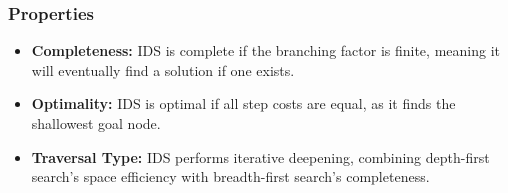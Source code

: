 \subsubsection*{Properties}
\begin{itemize}
    \item \textbf{Completeness:} IDS is complete if the branching factor is finite, meaning it will eventually find a solution if one exists.
    \item \textbf{Optimality:} IDS is optimal if all step costs are equal, as it finds the shallowest goal node.
    \item \textbf{Traversal Type:} IDS performs iterative deepening, combining depth-first search's space efficiency with breadth-first search's completeness.
\end{itemize}
